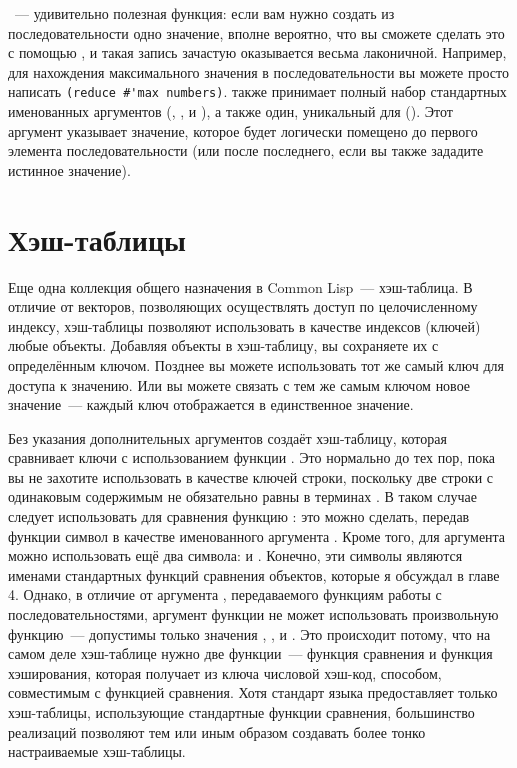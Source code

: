 ~--- удивительно полезная функция: если вам нужно создать из
последовательности одно значение, вполне вероятно, что вы сможете сделать это с помощью
, и такая запись зачастую оказывается весьма лаконичной.
Например, для нахождения максимального значения в последовательности вы можете просто
написать \lstinline!(reduce #'max numbers)!.  также принимает полный набор
стандартных именованных аргументов (, ,  и
), а также один, уникальный для  ().  Этот
аргумент указывает значение, которое будет логически помещено до первого элемента
последовательности (или после последнего, если вы также зададите  истинное
значение).

\section{Хэш-таблицы}

Еще одна коллекция общего назначения в Common Lisp~--- хэш-таблица.  В отличие от векторов,
позволяющих осуществлять доступ по целочисленному индексу,
хэш-таблицы позволяют использовать в качестве индексов (ключей) любые объекты.
Добавляя объекты в хэш-таблицу, вы сохраняете их с определённым ключом.  Позднее вы
можете использовать тот же самый ключ для доступа к значению.  Или вы можете связать
с тем же самым ключом новое значение~--- каждый ключ отображается в единственное значение.

Без указания дополнительных аргументов  создаёт хэш-таблицу, которая
сравнивает ключи с использованием функции .  Это нормально до тех пор, пока вы
не захотите использовать в качестве ключей строки, поскольку две строки с одинаковым
содержимым не обязательно равны в терминах .  В таком случае следует
использовать для сравнения функцию : это можно сделать, передав функции
 символ  в качестве именованного аргумента .
Кроме того, для аргумента  можно использовать ещё два символа:  и
.  Конечно, эти символы являются именами стандартных функций сравнения
объектов, которые я обсуждал в главе 4.  Однако, в отличие от аргумента ,
передаваемого функциям работы с последовательностями, аргумент  функции
 не может использовать произвольную функцию~--- допустимы только
значения , ,  и .  Это происходит потому, что
на самом деле хэш-таблице нужно две функции~--- функция сравнения и функция
хэширования, которая получает из ключа числовой хэш-код, способом, совместимым с
функцией сравнения.  Хотя стандарт языка предоставляет
только хэш-таблицы, использующие стандартные функции сравнения, большинство
реализаций позволяют тем или иным образом создавать более тонко настраиваемые
хэш-таблицы.

